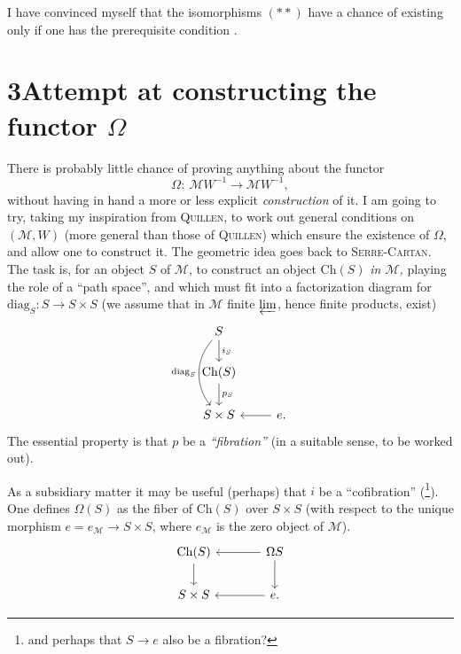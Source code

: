I have convinced myself that the isomorphisms $(**)$ have a chance of existing only if one has the prerequisite condition .

\newpage



\section*{3\quad Attempt at constructing the functor $\Omega$}

There is probably little chance of proving anything about the functor
\[
\Omega :\ \mathcal{M}W^{-1} \longrightarrow \mathcal{M}W^{-1},
\]
without having in hand a more or less explicit \textit{construction} of it. I am going to try, taking my inspiration from \textsc{Quillen}, to work out general conditions on $(\mathcal{M}, W)$ (more general than those of \textsc{Quillen}) which ensure the existence of $\Omega$, and allow one to construct it. The geometric idea goes back to \textsc{Serre-Cartan}. The task is, for an object $S$ of $\mathcal{M}$, to construct an object $\mathrm{Ch}(S)$ \textit{in $\mathcal{M}$,} playing the role of a ``path space'', and which must fit into a factorization diagram for $\mathrm{diag}_S : S \longrightarrow S \times S$ (we assume that in $\mathcal{M}$ finite $\varprojlim$, hence finite products, exist)
\[
\begin{tikzcd}
S \arrow[d, "i_S"] \arrow[dd, bend right=40, "\mathrm{diag}_S"'] & \\
\mathrm{Ch}(S) \arrow[d, "p_S"] & \\
S \times S & e. \arrow[l]
\end{tikzcd}
\]
The essential property is that $p$ be a \textit{``fibration''} (in a suitable sense, to be worked out).


As a subsidiary matter it may be useful (perhaps) that $i$ be a ``cofibration'' (\footnote[9]{and perhaps that $S \longrightarrow e$ also be a fibration?}). One defines $\Omega(S)$ as the fiber of $\mathrm{Ch}(S)$ over $S{\times}S$ (with respect to the unique morphism $e = e_{\mathcal{M}} \longrightarrow S\times S$, where $e_{\mathcal{M}}$ is the zero object of $\mathcal{M}$).
\[
\begin{tikzcd}[column sep=large]
\mathrm{Ch}(S) \arrow[d] & \Omega S \arrow[l] \arrow[d]\\
S \times S & e. \arrow[l]
\end{tikzcd}
\]

